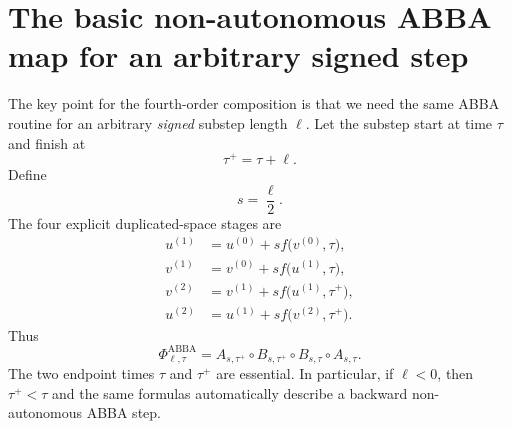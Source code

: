 \documentclass[11pt,a4paper]{article}
\newcommand{\PhiA}{\Phi^{\mathrm{ABBA}}}
\begin{document}
\section{The basic non-autonomous ABBA map for an arbitrary signed step}
The key point for the fourth-order composition is that we need the same ABBA routine for an arbitrary \emph{signed} substep length $\ell$. Let the substep start at time $\tau$ and finish at
\begin{equation}
    \tau^+=\tau+\ell.
\end{equation}
Define
\begin{equation}
    s=\frac{\ell}{2}.
\end{equation}
The four explicit duplicated-space stages are
\begin{align}
    u^{(1)}&=u^{(0)}+s f\bigl(v^{(0)},\tau\bigr), \label{eq:A1}\\
    v^{(1)}&=v^{(0)}+s f\bigl(u^{(1)},\tau\bigr), \label{eq:B1}\\
    v^{(2)}&=v^{(1)}+s f\bigl(u^{(1)},\tau^+\bigr), \label{eq:B2}\\
    u^{(2)}&=u^{(1)}+s f\bigl(v^{(2)},\tau^+\bigr). \label{eq:A2}
\end{align}
Thus
\begin{equation}
    \PhiA_{\ell,\tau}
    =A_{s,\tau^+}\circ B_{s,\tau^+}\circ B_{s,\tau}\circ A_{s,\tau}.
\end{equation}
The two endpoint times $\tau$ and $\tau^+$ are essential. In particular, if $\ell<0$, then $\tau^+<\tau$ and the same formulas automatically describe a backward non-autonomous ABBA step.
\end{document}
